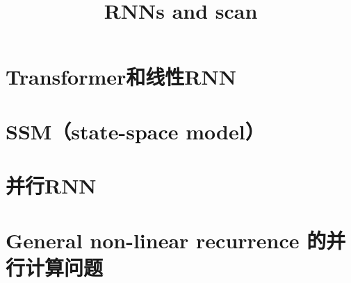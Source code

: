 \documentclass[UTF8]{ctexart}
\title{RNNs and scan}
\begin{document}
\tableofcontents
\thispagestyle{empty}
\newpage
\setcounter{page}{1}



\noindent
\linespread{1.2}
\selectfont
\setlength{\topskip}{0ex}
\setlength{\parskip}{1ex}
\setlength{\lineskip}{1em}

\section{Transformer和线性RNN}


\section{SSM（state-space model）}


\newpage
\section{并行RNN}


\newpage
\section{General non-linear recurrence 的并行计算问题}



\begin{appendices}

\end{appendices}

\newpage

\end{document}
